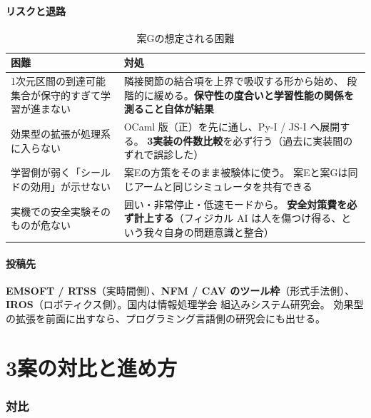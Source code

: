\documentclass[11pt,a4paper]{article}
\newcommand{\prob}[1]{\textbf{\textcolor{red!55!black}{#1}}}
\newcommand{\keyp}[1]{\textbf{\textcolor{blue!45!black}{#1}}}
\begin{document}
\subsection{リスクと退路}

\begin{table}[htbp]
\centering
\small
\caption{案Gの想定される困難}
\begin{tabularx}{\textwidth}{@{}X X@{}}
\toprule
\textbf{困難} & \textbf{対処} \\
\midrule
1次元区間の到達可能集合が保守的すぎて学習が進まない & 隣接関節の結合項を上界で吸収する形から始め、
  段階的に緩める。\keyp{保守性の度合いと学習性能の関係を測ること自体が結果} \\
効果型の拡張が処理系に入らない & OCaml 版（正）を先に通し、Py-I / JS-I へ展開する。
  \prob{3実装の件数比較}を必ず行う（過去に実装間のずれで誤診した） \\
学習側が弱く「シールドの効用」が示せない & 案Eの方策をそのまま被験体に使う。
  案Eと案Gは同じアームと同じシミュレータを共有できる \\
実機での安全実験そのものが危ない & 囲い・非常停止・低速モードから。
  \keyp{安全対策費を必ず計上する}（フィジカル AI は人を傷つけ得る、という我々自身の問題意識と整合） \\
\bottomrule
\end{tabularx}
\end{table}

\subsection{投稿先}

\keyp{EMSOFT / RTSS}（実時間側）、\keyp{NFM / CAV のツール枠}（形式手法側）、
\keyp{IROS}（ロボティクス側）。国内は情報処理学会 組込みシステム研究会。
効果型の拡張を前面に出すなら、プログラミング言語側の研究会にも出せる。

\clearpage
\part{3案の対比と進め方}
\label{part:compare}

\section{対比}
\end{document}
